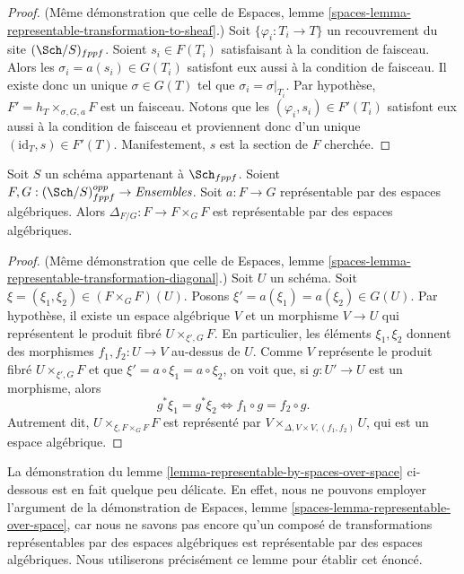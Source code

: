 \begin{proof}
(Même démonstration que celle de
Espaces, lemme \ref{spaces-lemma-representable-transformation-to-sheaf}.)
Soit $\{\varphi_i : T_i \to T\}$ un recouvrement du site
$(\Sch/S)_{fppf}$.
Soient $s_i \in F(T_i)$ satisfaisant à la condition de faisceau.
Alors les $\sigma_i = a(s_i) \in G(T_i)$ satisfont eux aussi à la condition
de faisceau. Il existe donc un unique $\sigma \in G(T)$ tel
que $\sigma_i = \sigma|_{T_i}$. Par hypothèse,
$F' = h_T \times_{\sigma, G, a} F$ est un faisceau.
Notons que les $(\varphi_i, s_i) \in F'(T_i)$ satisfont eux aussi à la
condition de faisceau et proviennent donc d'un unique
$(\text{id}_T, s) \in F'(T)$. Manifestement, $s$ est la section de
$F$ cherchée.
\end{proof}

\begin{lemma}
\label{lemma-representable-by-spaces-transformation-diagonal}
Soit $S$ un schéma appartenant à $\Sch_{fppf}$.
Soient $F, G : (\Sch/S)_{fppf}^{opp} \to \textit{Ensembles}$.
Soit $a : F \to G$ représentable par des espaces algébriques.
Alors $\Delta_{F/G} : F \to F \times_G F$ est représentable par
des espaces algébriques.
\end{lemma}

\begin{proof}
(Même démonstration que celle de
Espaces, lemme \ref{spaces-lemma-representable-transformation-diagonal}.)
Soit $U$ un schéma. Soit $\xi = (\xi_1, \xi_2) \in (F \times_G F)(U)$.
Posons $\xi' = a(\xi_1) = a(\xi_2) \in G(U)$.
Par hypothèse, il existe un espace algébrique $V$ et un morphisme $V \to U$
qui représentent le produit fibré $U \times_{\xi', G} F$.
En particulier, les éléments $\xi_1, \xi_2$ donnent des morphismes
$f_1, f_2 : U \to V$ au-dessus de $U$. Comme $V$ représente le
produit fibré $U \times_{\xi', G} F$ et que
$\xi' = a \circ \xi_1 = a \circ \xi_2$,
on voit que, si $g : U' \to U$ est un morphisme, alors
$$
g^*\xi_1 = g^*\xi_2
\Leftrightarrow
f_1 \circ g = f_2 \circ g.
$$
Autrement dit, $U \times_{\xi, F \times_G F} F$
est représenté par $V \times_{\Delta, V \times V, (f_1, f_2)} U$,
qui est un espace algébrique.
\end{proof}

\noindent
La démonstration du
lemme \ref{lemma-representable-by-spaces-over-space}
ci-dessous est en fait quelque peu délicate. En effet,
nous ne pouvons employer l'argument de la démonstration de
Espaces, lemme \ref{spaces-lemma-representable-over-space},
car nous ne savons pas encore qu'un composé de transformations
représentables par des espaces algébriques est représentable par des espaces
algébriques. Nous utiliserons précisément ce lemme pour établir cet énoncé.

